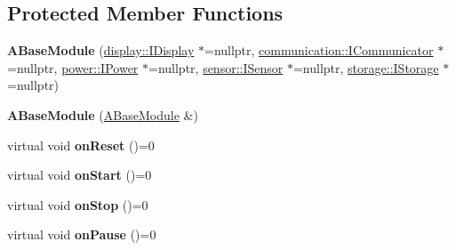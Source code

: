 \subsection*{Protected Member Functions}
\begin{DoxyCompactItemize}
\item 
\mbox{\label{classwood_box_1_1module_1_1_a_base_module_a298241e2e4aa8c755769887049a70dbb}} 
{\bfseries A\+Base\+Module} (\mbox{\hyperlink{classwood_box_1_1display_1_1_i_display}{display\+::\+I\+Display}} $\ast$=nullptr, \mbox{\hyperlink{classwood_box_1_1communication_1_1_i_communicator}{communication\+::\+I\+Communicator}} $\ast$=nullptr, \mbox{\hyperlink{classwood_box_1_1power_1_1_i_power}{power\+::\+I\+Power}} $\ast$=nullptr, \mbox{\hyperlink{classwood_box_1_1sensor_1_1_i_sensor}{sensor\+::\+I\+Sensor}} $\ast$=nullptr, \mbox{\hyperlink{classwood_box_1_1storage_1_1_i_storage}{storage\+::\+I\+Storage}} $\ast$=nullptr)
\item 
\mbox{\label{classwood_box_1_1module_1_1_a_base_module_ab17a455ac1d2988a48aa7bbca4af0b64}} 
{\bfseries A\+Base\+Module} (\mbox{\hyperlink{classwood_box_1_1module_1_1_a_base_module}{A\+Base\+Module}} \&)
\item 
\mbox{\label{classwood_box_1_1module_1_1_a_base_module_a393bee87aaac25c40a7991c9aee5718a}} 
virtual void {\bfseries on\+Reset} ()=0
\item 
\mbox{\label{classwood_box_1_1module_1_1_a_base_module_a7ae47c5d0da877569df890936a93e488}} 
virtual void {\bfseries on\+Start} ()=0
\item 
\mbox{\label{classwood_box_1_1module_1_1_a_base_module_a86ca0e43cfbd4c515cbe02ff42f1737e}} 
virtual void {\bfseries on\+Stop} ()=0
\item 
\mbox{\label{classwood_box_1_1module_1_1_a_base_module_a146eee2d0977546e0fed7bcf5135a8db}} 
virtual void {\bfseries on\+Pause} ()=0
\item 
\mbox{\label{classwood_box_1_1module_1_1_a_base_module_ad0d6ad896184c9966fec33b1f349606b}} 

\end{DoxyCompactItemize}
